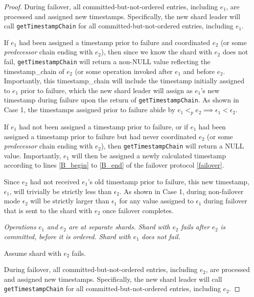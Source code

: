 \begin{proof}
During failover, all committed-but-not-ordered entries, including $e_1$, are processed and assigned new timestamps. Specifically, the new shard leader will call \texttt{getTimestampChain} for all committed-but-not-ordered entries, including $e_1$.


If $e_1$ had been assigned a timestamp prior to failure and coordinated $e_2$ (or some \textit{predecessor} chain ending with $e_2$), then since we know the shard with $e_2$ does not fail, \texttt{getTimestampChain} will return a non-NULL value reflecting the timestamp\_chain of $e_2$ (or some operation invoked after $e_1$ and before $e_2$. Importantly, this timestamp\_chain will include the timestamp initially assigned to $e_1$ prior to failure, which the new shard leader will assign as $e_1$'s new timestamp during failure upon the return of \texttt{getTimestampChain}. As shown in Case 1, the timestamps assigned prior to failure abide by $e_1 <_p e_2 \implies \epsilon_1 < \epsilon_2$.

If $e_1$ had not been assigned a timestamp prior to failure, or if $e_1$ had been assigned a timestamp prior to failure but had never coordinated $e_2$ (or some \textit{predecessor} chain ending with $e_2$), then \texttt{getTimestampChain} will return a NULL value. Importantly, $e_1$ will then be assigned a newly calculated timestamp according to lines \ref{B_begin} to \ref{B_end} of the failover protocol \ref{failover}.

Since $e_2$ had not received $e_1$'s old timestamp prior to failure, this new timestamp, $\epsilon_1$, will trivially be strictly less than $\epsilon_2$. As shown in Case 1, during non-failover mode $\epsilon_2$ will be strictly larger than $\epsilon_1$ for any value assigned to $\epsilon_1$ during failover that is sent to the shard with $e_2$ once failover completes.

 \textit{Operations $e_1$ and $e_2$ are at separate shards. Shard with $e_2$ fails after $e_2$ is \textit{committed}, before it is \textit{ordered}. Shard with $e_1$ does not fail.}

Assume shard with $e_2$ fails.

During failover, all committed-but-not-ordered entries, including $e_2$, are processed and assigned new timestamps. Specifically, the new shard leader will call \texttt{getTimestampChain} for all committed-but-not-ordered entries, including $e_2$.


\end{proof}
